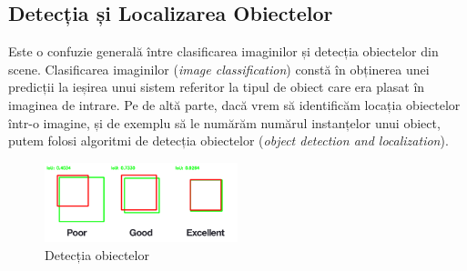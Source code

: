 \subsection{Detecția și Localizarea Obiectelor}
Este o confuzie generală între clasificarea imaginilor și detecția obiectelor din scene. Clasificarea imaginilor (\textit{image classification}) constă în obținerea unei predicții la ieșirea unui sistem referitor la tipul de obiect care era plasat în imaginea de intrare. Pe de altă parte, dacă vrem să identificăm locația obiectelor într-o imagine, și de exemplu să le numărăm numărul instanțelor unui obiect, putem folosi algoritmi de detecția obiectelor (\textit{object detection and localization}).\newline
\begin{figure}[h!]
    	\centering
	\captionsetup{justification=centering, margin=2cm}
	\includegraphics[width=0.5\textwidth]{figures/iou.png}
	\caption{Detecția obiectelor \cite{class_detect_segment}}
	\label{fig:class_detect_segment}
\end{figure}

